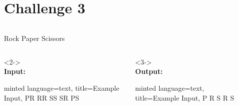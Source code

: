     \section{Challenge 3}\label{sec:challenge-3}
    \begin{frame}[c, fragile]
        \slidehead
        \begin{columns}[c]
            \begin{column}{.5\textwidth}
                \Large
                Rock Paper Scissors
                \vspace{1em}
                \normalsize

                \begin{columns}[c]
                    \begin{column}{.5\textwidth}
                        \begin{onlyenv}<2->
                            \mbox{}
                            \\
                            \textbf{Input:}
                            \begin{codeBlock}{
                                minted language=text,
                                title=Example Input,
                            }
                                PR
                                RR
                                SS
                                SR
                                PS
                            \end{codeBlock}
                        \end{onlyenv}
                    \end{column}
                    \begin{column}{.5\textwidth}
                        \begin{onlyenv}<3->
                            \mbox{}
                            \\
                            \textbf{Output:}
                            \begin{codeBlock}{
                                minted language=text,
                                title=Example Input,
                            }
                                P
                                R
                                S
                                R
                                S
                            \end{codeBlock}
                        \end{onlyenv}
                    \end{column}
                \end{columns}
            \end{column}
            \begin{column}{.5\textwidth}
                \centering
                
            \end{column}
        \end{columns}
    \end{frame}

